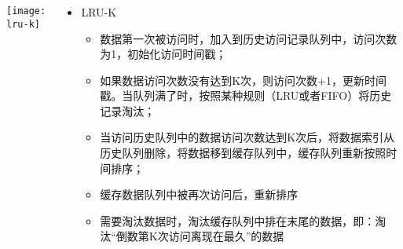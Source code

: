 \begin{frame}[plain]
	\frametitle{ }
	\begin{columns}
		\begin{column}{.4\textwidth}
			\centering
						\texttt{[image: lru-k]}
		\end{column}
		
		\begin{column}{.6\textwidth}
			
			\begin{itemize}
				\item LRU-K
				\begin{itemize}
					
					\item 数据第一次被访问时，加入到历史访问记录队列中，访问次数为1，初始化访问时间戳；
					\item 如果数据访问次数没有达到K次，则访问次数+1，更新时间戳。当队列满了时，按照某种规则（LRU或者FIFO）将历史记录淘汰；%
					\item 当访问历史队列中的数据访问次数达到K次后，将数据索引从历史队列删除，将数据移到缓存队列中，缓存队列重新按照时间排序；
					\item 缓存数据队列中被再次访问后，重新排序
					\item 需要淘汰数据时，淘汰缓存队列中排在末尾的数据，即：淘汰“倒数第K次访问离现在最久”的数据
					
					
				\end{itemize}
			\end{itemize}

			
		\end{column}
		
		
	\end{columns}
\end{frame}


